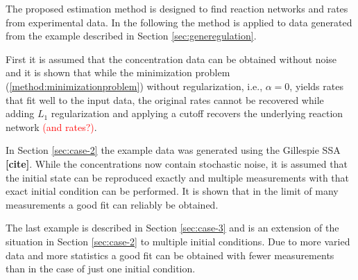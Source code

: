 \documentclass[oneside, abstracton, titlepage]{scrartcl}
\begin{document}
	The proposed estimation method is designed to find reaction networks and rates from experimental data. In the following the method is applied to data generated from the example described in Section \ref{sec:generegulation}.

	First it is assumed that the concentration data can be obtained without noise and it is shown that while the minimization problem (\ref{method:minimizationproblem}) without regularization, i.e., $\alpha=0$, yields rates that fit well to the input data, the original rates cannot be recovered while adding $L_1$ regularization and applying a cutoff recovers the underlying reaction network \textcolor{red}{(and rates?)}.
	
	In Section \ref{sec:case-2} the example data was generated using the Gillespie SSA \textbf{[cite]}. While the concentrations now contain stochastic noise, it is assumed that the initial state can be reproduced exactly and multiple measurements with that exact initial condition can be performed. It is shown that in the limit of many measurements a good fit can reliably be obtained.
	
	The last example is described in Section \ref{sec:case-3} and is an extension of the situation in Section \ref{sec:case-2} to multiple initial conditions. Due to more varied data and more statistics a good fit can be obtained with fewer measurements than in the case of just one initial condition.
	
\end{document}
